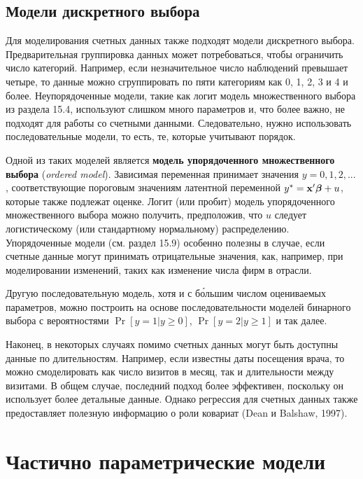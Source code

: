 \subsection{Модели дискретного выбора}\label{sec:20.4.6}

\noindent
Для моделирования счетных данных также подходят модели дискретного выбора. Предварительная группировка данных может потребоваться, чтобы ограничить число категорий. Например, если незначительное число наблюдений превышает четыре, то данные можно сгруппировать по пяти категориям как 0, 1, 2, 3 и 4 и более. Неупорядоченные модели, такие как логит модель множественного выбора из раздела 15.4, используют слишком много параметров и, что более важно, не подходят для работы со счетными данными. Следовательно, нужно использовать последовательные модели, то есть, те, которые учитывают порядок.

Одной из таких моделей является \textbf{модель упорядоченного множественного выбора} (\textit{ordered model}). %
Зависимая переменная принимает значения $y = 0, 1, 2, ...$, соответствующие пороговым значениям латентной переменной $y^* = \mathbf{x}'\bm{\beta} + u$, которые также подлежат оценке. Логит (или пробит) модель упорядоченного множественного выбора можно получить, предположив, что $u$ следует логистическому (или стандартному нормальному) распределению. Упорядоченные модели (см. раздел 15.9) особенно полезны в случае, если счетные данные могут принимать отрицательные значения, как, например, при моделировании изменений, таких как изменение числа фирм в отрасли.

Другую последовательную модель, хотя и с б\'{о}льшим числом оцениваемых параметров, можно построить на основе последовательности моделей бинарного выбора с вероятностями $\Pr[y = 1|y \ge 0]$, $\Pr[y = 2|y \ge 1]$ и так далее.

Наконец, в некоторых случаях помимо счетных данных могут быть доступны данные по длительностям. Например, если известны даты посещения врача, то можно смоделировать как число визитов в месяц, так и длительности между визитами. В общем случае, последний подход более эффективен, поскольку он использует более детальные данные. Однако регрессия для счетных данных также предоставляет полезную информацию о роли ковариат (Dean и Balshaw, 1997).




\section{Частично параметрические модели}\label{sec:20.5}

